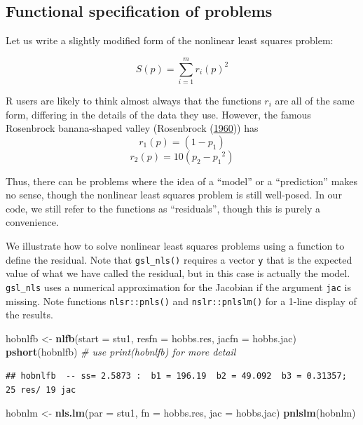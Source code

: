 \documentclass[
]{article}
\newenvironment{Shaded}{\begin{snugshade}}{\end{snugshade}}
\newcommand{\AttributeTok}[1]{\textcolor[rgb]{0.13,0.29,0.53}{#1}}
\newcommand{\CommentTok}[1]{\textcolor[rgb]{0.56,0.35,0.01}{\textit{#1}}}
\newcommand{\FunctionTok}[1]{\textcolor[rgb]{0.13,0.29,0.53}{\textbf{#1}}}
\newcommand{\NormalTok}[1]{#1}
\newcommand{\OtherTok}[1]{\textcolor[rgb]{0.56,0.35,0.01}{#1}}
\begin{document}
\hypertarget{functional-specification-of-problems}{%
\subsection{Functional specification of
problems}\label{functional-specification-of-problems}}

Let us write a slightly modified form of the nonlinear least squares
problem:

\[ S(p) = \sum_{i=1}^m { r_i(p)^2 }\]

R users are likely to think almost always that the functions \(r_i\) are
all of the same form, differing in the details of the data they use.
However, the famous Rosenbrock banana-shaped valley (Rosenbrock
(\protect\hyperlink{ref-Rosenbrock1960}{1960})) has
\[ r_1(p) = (1 - p_1)\] \[ r_2(p) = 10 (p_2 - {p_1}^2)\]

Thus, there can be problems where the idea of a ``model'' or a
``prediction'' makes no sense, though the nonlinear least squares
problem is still well-posed. In our code, we still refer to the
functions as ``residuals'', though this is purely a convenience.

We illustrate how to solve nonlinear least squares problems using a
function to define the residual. Note that \texttt{gsl\_nls()} requires
a vector \texttt{y} that is the expected value of what we have called
the residual, but in this case is actually the model. \texttt{gsl\_nls}
uses a numerical approximation for the Jacobian if the argument
\texttt{jac} is missing. Note functions \texttt{nlsr::pnls()} and
\texttt{nslr::pnlslm()} for a 1-line display of the results.

\begin{Shaded}
\begin{Highlighting}[]
\NormalTok{hobnlfb }\OtherTok{\textless{}{-}} \FunctionTok{nlfb}\NormalTok{(}\AttributeTok{start =}\NormalTok{ stu1, }\AttributeTok{resfn =}\NormalTok{ hobbs.res, }\AttributeTok{jacfn =}\NormalTok{ hobbs.jac)}
\FunctionTok{pshort}\NormalTok{(hobnlfb) }\CommentTok{\# use print(hobnlfb) for more detail}
\end{Highlighting}
\end{Shaded}

\begin{verbatim}
## hobnlfb  -- ss= 2.5873 :  b1 = 196.19  b2 = 49.092  b3 = 0.31357; 25 res/ 19 jac
\end{verbatim}

\begin{Shaded}
\begin{Highlighting}[]
\NormalTok{hobnlm }\OtherTok{\textless{}{-}} \FunctionTok{nls.lm}\NormalTok{(}\AttributeTok{par =}\NormalTok{ stu1, }\AttributeTok{fn =}\NormalTok{ hobbs.res, }\AttributeTok{jac =}\NormalTok{ hobbs.jac)}
\FunctionTok{pnlslm}\NormalTok{(hobnlm)  }
\end{Highlighting}
\end{Shaded}
\end{document}
